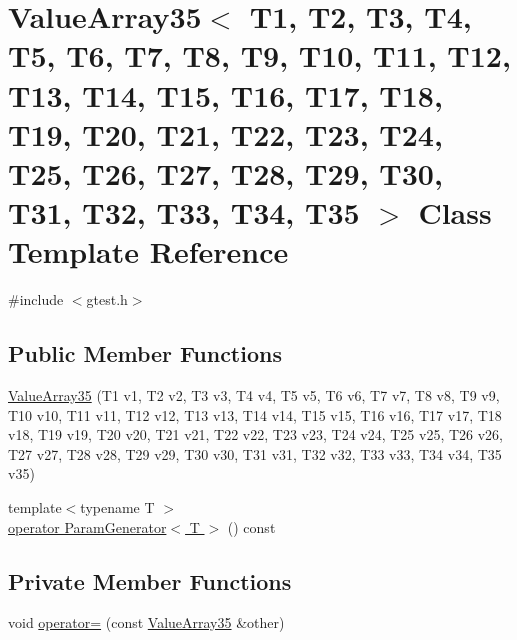 \hypertarget{classtesting_1_1internal_1_1ValueArray35}{\section{\-Value\-Array35$<$ \-T1, \-T2, \-T3, \-T4, \-T5, \-T6, \-T7, \-T8, \-T9, \-T10, \-T11, \-T12, \-T13, \-T14, \-T15, \-T16, \-T17, \-T18, \-T19, \-T20, \-T21, \-T22, \-T23, \-T24, \-T25, \-T26, \-T27, \-T28, \-T29, \-T30, \-T31, \-T32, \-T33, \-T34, \-T35 $>$ \-Class \-Template \-Reference}
\label{df/d51/classtesting_1_1internal_1_1ValueArray35}
}


{\ttfamily \#include $<$gtest.\-h$>$}

\subsection*{\-Public \-Member \-Functions}
\begin{DoxyCompactItemize}
\item 
\hyperlink{classtesting_1_1internal_1_1ValueArray35_a71f4b3a78a62f05233235cfe64b67467}{\-Value\-Array35} (\-T1 v1, \-T2 v2, \-T3 v3, \-T4 v4, \-T5 v5, \-T6 v6, \-T7 v7, \-T8 v8, \-T9 v9, \-T10 v10, \-T11 v11, \-T12 v12, \-T13 v13, \-T14 v14, \-T15 v15, \-T16 v16, \-T17 v17, \-T18 v18, \-T19 v19, \-T20 v20, \-T21 v21, \-T22 v22, \-T23 v23, \-T24 v24, \-T25 v25, \-T26 v26, \-T27 v27, \-T28 v28, \-T29 v29, \-T30 v30, \-T31 v31, \-T32 v32, \-T33 v33, \-T34 v34, \-T35 v35)
\item 
{\footnotesize template$<$typename T $>$ }\\\hyperlink{classtesting_1_1internal_1_1ValueArray35_a08ef46fa12c9dd8ef6fc630baeea89b7}{operator Param\-Generator$<$ T $>$} () const 
\end{DoxyCompactItemize}
\subsection*{\-Private \-Member \-Functions}
\begin{DoxyCompactItemize}
\item 
void \hyperlink{classtesting_1_1internal_1_1ValueArray35_aa036993398c78b8fdf07d361f73c020d}{operator=} (const \hyperlink{classtesting_1_1internal_1_1ValueArray35}{\-Value\-Array35} \&other)
\end{DoxyCompactItemize}
